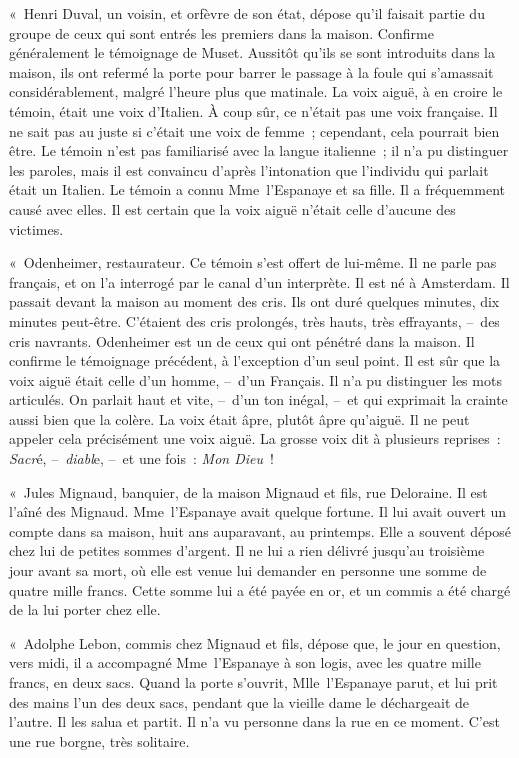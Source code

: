 \documentclass[french,twoside]{book} %
\begin{document}
« Henri Duval, un voisin, et orfèvre de son état, dépose qu’il faisait partie du groupe de ceux qui sont entrés les premiers dans la maison. Confirme généralement le témoignage de Muset. Aussitôt qu’ils se sont introduits dans la maison, ils ont refermé la porte pour barrer le passage à la foule qui s’amassait considérablement, malgré l’heure plus que matinale. La voix aiguë, à en croire le témoin, était une voix d’Italien. À coup sûr, ce n’était pas une voix française. Il ne sait pas au juste si c’était une voix de femme ; cependant, cela pourrait bien être. Le témoin n’est pas familiarisé avec la langue italienne ; il n’a pu distinguer les paroles, mais il est convaincu d’après l’intonation que l’individu qui parlait était un Italien. Le témoin a connu Mme l’Espanaye et sa fille. Il a fréquemment causé avec elles. Il est certain que la voix aiguë n’était celle d’aucune des victimes.\par
« Odenheimer, restaurateur. Ce témoin s’est offert de lui-même. Il ne parle pas français, et on l’a interrogé par le canal d’un interprète. Il est né à Amsterdam. Il passait devant la maison au moment des cris. Ils ont duré quelques minutes, dix minutes peut-être. C’étaient des cris prolongés, très hauts, très effrayants, – des cris navrants. Odenheimer est un de ceux qui ont pénétré dans la maison. Il confirme le témoignage précédent, à l’exception d’un seul point. Il est sûr que la voix aiguë était celle d’un homme, – d’un Français. Il n’a pu distinguer les mots articulés. On parlait haut et vite, – d’un ton inégal, – et qui exprimait la crainte aussi bien que la colère. La voix était âpre, plutôt âpre qu’aiguë. Il ne peut appeler cela précisément une voix aiguë. La grosse voix dit à plusieurs reprises : \emph{Sacr}é, – \emph{diabl}e, – et une fois : \emph{Mon Dieu} !\par
« Jules Mignaud, banquier, de la maison Mignaud et fils, rue Deloraine. Il est l’aîné des Mignaud. Mme l’Espanaye avait quelque fortune. Il lui avait ouvert un compte dans sa maison, huit ans auparavant, au printemps. Elle a souvent déposé chez lui de petites sommes d’argent. Il ne lui a rien délivré jusqu’au troisième jour avant sa mort, où elle est venue lui demander en personne une somme de quatre mille francs. Cette somme lui a été payée en or, et un commis a été chargé de la lui porter chez elle.\par
« Adolphe Lebon, commis chez Mignaud et fils, dépose que, le jour en question, vers midi, il a accompagné Mme l’Espanaye à son logis, avec les quatre mille francs, en deux sacs. Quand la porte s’ouvrit, Mlle l’Espanaye parut, et lui prit des mains l’un des deux sacs, pendant que la vieille dame le déchargeait de l’autre. Il les salua et partit. Il n’a vu personne dans la rue en ce moment. C’est une rue borgne, très solitaire.\par
\end{document}
